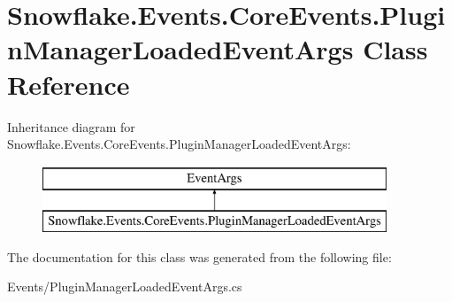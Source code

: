 \hypertarget{class_snowflake_1_1_events_1_1_core_events_1_1_plugin_manager_loaded_event_args}{}\section{Snowflake.\+Events.\+Core\+Events.\+Plugin\+Manager\+Loaded\+Event\+Args Class Reference}
\label{class_snowflake_1_1_events_1_1_core_events_1_1_plugin_manager_loaded_event_args}
Inheritance diagram for Snowflake.\+Events.\+Core\+Events.\+Plugin\+Manager\+Loaded\+Event\+Args\+:\begin{figure}[H]
\begin{center}
\leavevmode
\includegraphics[height=2.000000cm]{class_snowflake_1_1_events_1_1_core_events_1_1_plugin_manager_loaded_event_args}
\end{center}
\end{figure}


The documentation for this class was generated from the following file\+:\begin{DoxyCompactItemize}
\item 
Events/Plugin\+Manager\+Loaded\+Event\+Args.\+cs\end{DoxyCompactItemize}
